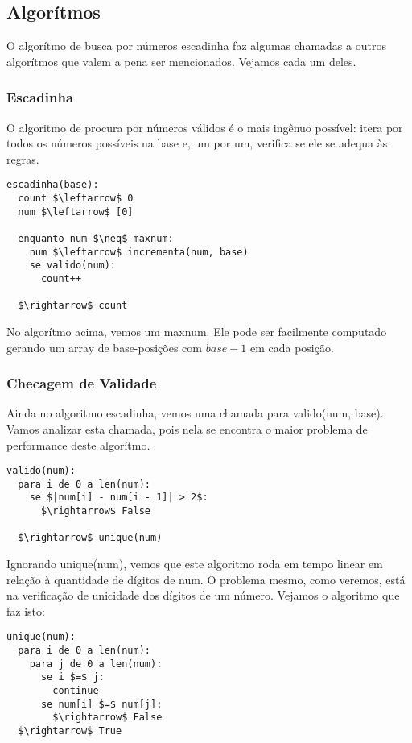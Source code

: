 \documentclass[12pt]{article}
\begin{document}
\subsection{Algorítmos}\label{section:primeira:algoritmos}

O algorítmo de busca por números escadinha faz algumas chamadas a outros algorítmos que valem a pena ser mencionados. Vejamos cada um deles.

\subsubsection{Escadinha}\label{section:primeira:algoritmos:escadinha}
O algoritmo de procura por números válidos é o mais ingênuo possível:
itera por todos os números possíveis na base e, um por um, verifica
se ele se adequa às regras.

\begin{lstlisting}
escadinha(base):
  count $\leftarrow$ 0
  num $\leftarrow$ [0] 
	
  enquanto num $\neq$ maxnum: 
    num $\leftarrow$ incrementa(num, base) 
    se valido(num):
      count++

  $\rightarrow$ count
\end{lstlisting}


No algorítmo acima, vemos um {\sf maxnum}.
Ele pode ser facilmente computado gerando um array de base-posições
com $base-1$ em cada posição. 

\subsubsection{Checagem de Validade}\label{section:primeira:algoritmos:valido}
Ainda no algoritmo escadinha, vemos uma chamada para {\sf valido(num, base)}.
Vamos analizar esta chamada, pois nela se encontra o maior problema
de performance deste algorítmo.

\begin{lstlisting}
valido(num):
  para i de 0 a len(num):
    se $|num[i] - num[i - 1]| > 2$:
      $\rightarrow$ False

  $\rightarrow$ unique(num)
\end{lstlisting}


Ignorando {\sf unique(num)}, vemos que este algoritmo roda em tempo linear
em relação à quantidade de dígitos de {\sf num}. O problema mesmo, como
veremos, está na verificação de unicidade dos dígitos de um número.
Vejamos o algoritmo que faz isto:

\begin{lstlisting}
unique(num):
  para i de 0 a len(num):
    para j de 0 a len(num):
      se i $=$ j:
        continue 
      se num[i] $=$ num[j]:
        $\rightarrow$ False 
  $\rightarrow$ True 
\end{lstlisting}
\end{document}
